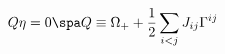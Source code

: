 \begin{equation}
Q \eta = 0 \spa Q \equiv \Omega_+
+ \frac{1}{2} \sum_{i<j} J_{ij} \Gamma^{ij}
\end{equation}

